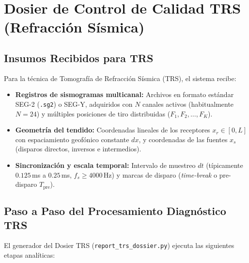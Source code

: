 \documentclass[11pt,a4paper]{article}
\begin{document}
\newpage
\section{Dosier de Control de Calidad TRS (Refracción Sísmica)}

\subsection{Insumos Recibidos para TRS}
Para la técnica de Tomografía de Refracción Sísmica (TRS), el sistema recibe:
\begin{itemize}
    \item \textbf{Registros de sismogramas multicanal:} Archivos en formato estándar SEG-2 (\texttt{.sg2}) o SEG-Y, adquiridos con $N$ canales activos (habitualmente $N=24$) y múltiples posiciones de tiro distribuidas ($F_1, F_2, \dots, F_K$).
    \item \textbf{Geometría del tendido:} Coordenadas lineales de los receptores $x_r \in [0, L]$ con espaciamiento geofónico constante $dx$, y coordenadas de las fuentes $x_s$ (disparos directos, inversos e intermedios).
    \item \textbf{Sincronización y escala temporal:} Intervalo de muestreo $dt$ (típicamente $0.125$\,ms a $0.25$\,ms, $f_s \ge 4000$\,Hz) y marcas de disparo (\emph{time-break} o pre-disparo $T_{\text{pre}}$).
\end{itemize}

\subsection{Paso a Paso del Procesamiento Diagnóstico TRS}
El generador del Dosier TRS (\texttt{report\_trs\_dossier.py}) ejecuta las siguientes etapas analíticas:
\end{document}
